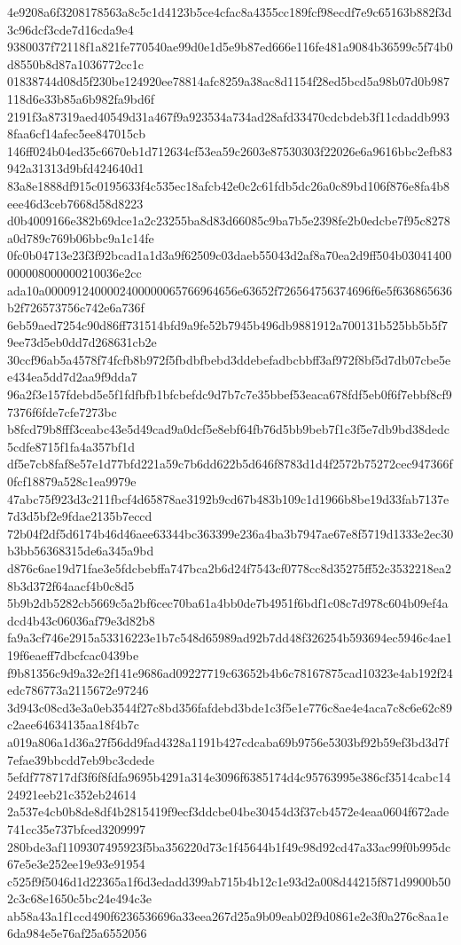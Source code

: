 {4e9208a6f3208178563a8c5c1d4123b5ce4cfac8a4355cc189fcf98ecdf7e9c65163b882f3d3c96dcf3cde7d16cda9e4
9380037f72118f1a821fe770540ae99d0e1d5e9b87ed666e116fe481a9084b36599c5f74b0d8550b8d87a1036772cc1c
01838744d08d5f230be124920ee78814afc8259a38ac8d1154f28ed5bcd5a98b07d0b987118d6e33b85a6b982fa9bd6f
2191f3a87319aed40549d31a467f9a923534a734ad28afd33470cdcbdeb3f11cdaddb9938faa6cf14afec5ee847015cb
146ff024b04ed35c6670eb1d712634cf53ea59c2603e87530303f22026e6a9616bbc2efb83942a31313d9bfd424640d1
83a8e1888df915c0195633f4c535ec18afcb42e0c2c61fdb5dc26a0c89bd106f876e8fa4b8eee46d3ceb7668d58d8223
d0b4009166e382b69dce1a2c23255ba8d83d66085c9ba7b5e2398fe2b0edcbe7f95c8278a0d789c769b06bbc9a1c14fe
0fc0b04713e23f3f92bcad1a1d3a9f62509c03daeb55043d2af8a70ea2d9ff504b03041400000008000000210036e2cc
ada10a0000912400002400000065766964656e63652f726564756374696f6e5f636865636b2f726573756c742e6a736f
6eb59aed7254c90d86ff731514bfd9a9fe52b7945b496db9881912a700131b525bb5b5f79ee73d5eb0dd7d268631cb2e
30ccf96ab5a4578f74fcfb8b972f5fbdbfbebd3ddebefadbcbbff3af972f8bf5d7db07cbe5ee434ea5dd7d2aa9f9dda7
96a2f3e157fdebd5e5f1fdfbfb1bfcbefdc9d7b7c7e35bbef53eaca678fdf5eb0f6f7ebbf8cf97376f6fde7cfe7273bc
b8fcd79b8fff3ceabc43e5d49cad9a0dcf5e8ebf64fb76d5bb9beb7f1c3f5e7db9bd38dedc5cdfe8715f1fa4a357bf1d
df5e7cb8faf8e57e1d77bfd221a59c7b6dd622b5d646f8783d1d4f2572b75272cec947366f0fcf18879a528c1ea9979e
47abc75f923d3c211fbcf4d65878ae3192b9cd67b483b109c1d1966b8be19d33fab7137e7d3d5bf2e9fdae2135b7eccd
72b04f2df5d6174b46d46aee63344bc363399e236a4ba3b7947ae67e8f5719d1333e2ec30b3bb56368315de6a345a9bd
d876c6ae19d71fae3e5fdcbebffa747bca2b6d24f7543cf0778cc8d35275ff52c3532218ea28b3d372f64aacf4b0c8d5
5b9b2db5282cb5669c5a2bf6cec70ba61a4bb0de7b4951f6bdf1c08c7d978c604b09ef4adcd4b43c06036af79e3d82b8
fa9a3cf746e2915a53316223e1b7c548d65989ad92b7dd48f326254b593694ec5946c4ae119f6eaeff7dbcfcac0439be
f9b81356c9d9a32e2f141e9686ad09227719c63652b4b6c78167875cad10323e4ab192f24edc786773a2115672e97246
3d943c08cd3e3a0eb3544f27c8bd356fafdebd3bde1c3f5e1e776c8ae4e4aca7c8c6e62c89c2aee64634135aa18f4b7c
a019a806a1d36a27f56dd9fad4328a1191b427cdcaba69b9756e5303bf92b59ef3bd3d7f7efae39bbcdd7eb9bc3cdede
5efdf778717df3f6f8fdfa9695b4291a314e3096f6385174d4c95763995e386cf3514cabc1424921eeb21c352eb24614
2a537e4cb0b8de8df4b2815419f9ecf3ddcbe04be30454d3f37cb4572e4eaa0604f672ade741cc35e737bfced3209997
280bde3af1109307495923f5ba356220d73c1f45644b1f49c98d92cd47a33ac99f0b995dc67e5e3e252ee19e93e91954
c525f9f5046d1d22365a1f6d3edadd399ab715b4b12c1e93d2a008d44215f871d9900b502c3c68e1650c5bc24e494c3e
ab58a43a1f1ccd490f6236536696a33eea267d25a9b09eab02f9d0861e2e3f0a276c8aa1e6da984e5e76af25a6552056
}
